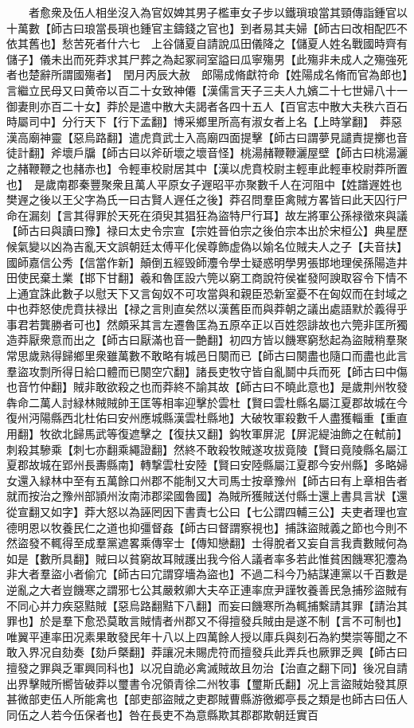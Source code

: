 　　者愈衆及伍人相坐沒入為官奴婢其男子檻車女子步以鐵瑣琅當其頸傳詣鍾官以十萬數【師古曰琅當長瑣也鍾官主鑄錢之官也】到者易其夫婦【師古曰改相配匹不依其舊也】愁苦死者什六七　上谷儲夏自請說瓜田儀降之【儲夏人姓名戰國時齊有儲子】儀未出而死莽求其尸葬之為起冢祠室謚曰瓜寧殤男【此殤非未成人之殤強死者也楚辭所謂國殤者】　閏月丙辰大赦　郎陽成脩獻符命【姓陽成名脩而官為郎也】言繼立民母又曰黄帝以百二十女致神僊【漢儒言天子三夫人九嬪二十七世婦八十一御妻則亦百二十女】莽於是遣中散大夫謁者各四十五人【百官志中散大夫秩六百石時屬司中】分行天下【行下孟翻】博采鄉里所高有淑女者上名【上時掌翻】　莽惡漢高廟神靈【惡烏路翻】遣虎賁武士入高廟四面提擊【師古曰謂夢見譴責提擲也音徒計翻】斧壞戶牖【師古曰以斧斫壞之壞音怪】桃湯赭鞭鞭灑屋壁【師古曰桃湯灑之赭鞭鞭之也赭赤也】令輕車校尉居其中【漢以虎賁校尉主輕車此輕車校尉莽所置也】　是歲南郡秦豐聚衆且萬人平原女子遟昭平亦聚數千人在河阻中【姓譜遟姓也樊遟之後以王父字為氏一曰古賢人遟任之後】莽召問羣臣禽賊方畧皆曰此天囚行尸命在漏刻【言其得罪於天死在須臾其猖狂為盜特尸行耳】故左將軍公孫禄徵來與議【師古曰與讀曰豫】禄曰太史令宗宣【宗姓晉伯宗之後伯宗本出於宋桓公】典星歷候氣變以凶為吉亂天文誤朝廷太傅平化侯尊飾虚偽以媮名位賊夫人之子【夫音扶】國師嘉信公秀【信當作新】顛倒五經毁師灋令學士疑惑明學男張邯地理侯孫陽造井田使民棄土業【邯下甘翻】羲和魯匡設六筦以窮工商說符侯崔發阿諛取容令下情不上通宜誅此數子以慰天下又言匈奴不可攻當與和親臣恐新室憂不在匈奴而在封域之中也莽怒使虎賁扶禄出【禄之言則直矣然以漢舊臣而與莽朝之議出處語默於義得乎事君若龔勝者可也】然頗采其言左遷魯匡為五原卒正以百姓怨誹故也六筦非匡所獨造莽厭衆意而出之【師古曰厭滿也音一艶翻】初四方皆以饑寒窮愁起為盜賊稍羣聚常思歲熟得歸鄉里衆雖萬數不敢略有城邑日闋而已【師古曰闋盡也隨口而盡也此言羣盜攻剽所得日給口體而已闋空穴翻】諸長吏牧守皆自亂鬬中兵而死【師古曰中傷也音竹仲翻】賊非敢欲殺之也而莽終不諭其故【師古曰不曉此意也】是歲荆州牧發犇命二萬人討緑林賊賊帥王匡等相率迎擊於雲杜【賢曰雲杜縣名屬江夏郡故城在今復州沔陽縣西北杜佑曰安州應城縣漢雲杜縣地】大破牧軍殺數千人盡獲輜重【重直用翻】牧欲北歸馬武等復遮擊之【復扶又翻】鈎牧軍屏泥【屏泥緹油飾之在軾前】刺殺其驂乘【刺七亦翻乘繩證翻】然終不敢殺牧賊遂攻拔竟陵【賢曰竟陵縣名屬江夏郡故城在郢州長夀縣南】轉撃雲杜安陸【賢曰安陸縣屬江夏郡今安州縣】多略婦女還入緑林中至有五萬餘口州郡不能制又大司馬士按章豫州【師古曰有上章相告者就而按治之豫州部頴州汝南沛郡梁國魯國】為賊所獲賊送付縣士還上書具言狀【還從宣翻又如字】莽大怒以為誣罔因下書責七公曰【七公謂四輔三公】夫吏者理也宣德明恩以牧養民仁之道也抑彊督姦【師古曰督謂察視也】捕誅盜賊義之節也今則不然盜發不輒得至成羣黨遮畧乘傳宰士【傳知戀翻】士得脫者又妄自言我責數賊何為如是【數所具翻】賊曰以貧窮故耳賊護出我今俗人議者率多若此惟貧困饑寒犯灋為非大者羣盜小者偷宂【師古曰宂謂穿墻為盜也】不過二科今乃結謀連黨以千百數是逆亂之大者豈饑寒之謂邪七公其嚴敕卿大夫卒正連率庶尹謹牧養善民急捕殄盜賊有不同心并力疾惡黠賊【惡烏路翻黠下八翻】而妄曰饑寒所為輒捕繫請其罪【請治其罪也】於是羣下愈恐莫敢言賊情者州郡又不得擅發兵賊由是遂不制【言不可制也】唯翼平連率田况素果敢發民年十八以上四萬餘人授以庫兵與刻石為約樊崇等聞之不敢入界况自劾奏【劾戶槩翻】莽讓况未賜虎符而擅發兵此弄兵也厥罪乏興【師古曰擅發之罪與乏軍興同科也】以况自詭必禽滅賊故且勿治【治直之翻下同】後况自請出界擊賊所嚮皆破莽以璽書令况領青徐二州牧事【璽斯氏翻】况上言盜賊始發其原甚微部吏伍人所能禽也【部吏部盜賊之吏郡賊曹縣游徼郷亭長之類是也師古曰伍人同伍之人若今伍保者也】咎在長吏不為意縣欺其郡郡欺朝廷實百